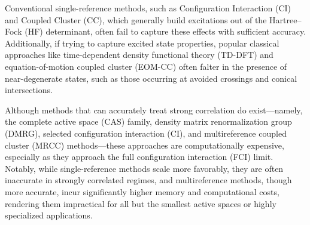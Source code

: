 \documentclass[aip,jcp,amsmath,amssymb, reprint]{revtex4-1}
\begin{document}
Conventional single-reference methods, such as Configuration Interaction (CI) and Coupled Cluster (CC), which generally build excitations out of the Hartree–Fock (HF) determinant, often fail to capture these effects with sufficient accuracy.\cite{Sherrill1999TheConfiguration,bartlett2007coupled}
Additionally, if trying to capture excited state properties, popular classical approaches like time-dependent density functional theory (TD-DFT)\cite{runge1984density,casida1995time} and equation-of-motion coupled cluster (EOM-CC)\cite{stanton1993equation} often falter in the presence of near-degenerate states, such as those occurring at avoided crossings and conical intersections.\cite{dreuw2004failure,krylov2008equation}

Although methods that can accurately treat strong correlation do exist—namely, the complete active space (CAS) family,\cite{Roos:1980wj} density matrix renormalization group (DMRG),\cite{White1992DensityMatrix} selected configuration interaction (CI),\cite{Huron1973IterativePerturbation,Buenker1974IndividualizedConfiguration} and multireference coupled cluster (MRCC) methods\cite{vcivzek1969use,lindgren1978coupled,jeziorski1981coupled,lyakh2012multireference, kohn2013state, evangelista2018perspective}—these approaches are computationally expensive, especially as they approach the full configuration interaction (FCI) limit.
Notably, while single-reference methods scale more favorably, they are often inaccurate in strongly correlated regimes, and multireference methods, though more accurate, incur significantly higher memory and computational costs, rendering them impractical for all but the smallest active spaces or highly specialized applications.\cite{piecuch1990coupled, piecuch2005renormalized,Limacher2013NewMean,Bulik2015CanSingle}
\end{document}
